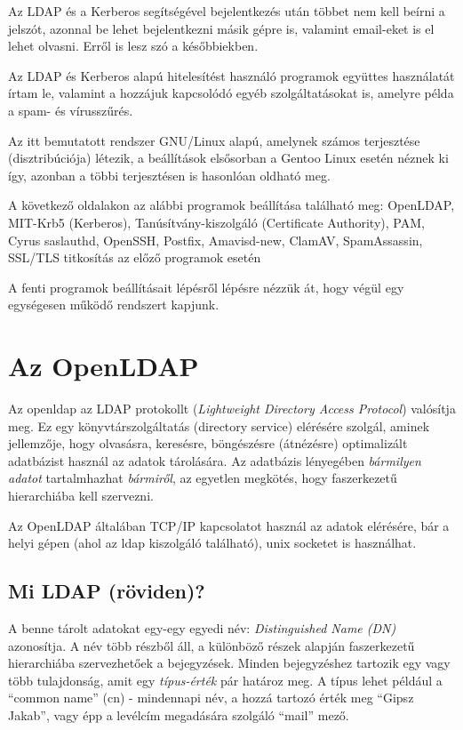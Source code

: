 \documentclass[fleqn,10pt,a4paper,titlepage]{article}
\begin{document}
  Az LDAP és a Kerberos segítségével bejelentkezés után többet nem kell beírni a jelszót, azonnal be lehet bejelentkezni
  másik gépre is, valamint email-eket is el lehet olvasni. Erről is lesz szó a későbbiekben.

  Az LDAP és Kerberos alapú hitelesítést használó programok együttes használatát írtam le, valamint a hozzájuk
  kapcsolódó egyéb szolgáltatásokat is, amelyre példa a spam- és vírusszűrés.

  Az itt bemutatott rendszer GNU/Linux alapú, amelynek számos terjesztése (disztribúciója) létezik, a beállítások
  elsősorban a Gentoo Linux esetén néznek ki így, azonban a többi terjesztésen is hasonlóan oldható meg.

  A következő oldalakon az alábbi programok beállítása található meg:
  OpenLDAP,
  MIT-Krb5 (Kerberos),
  Tanúsítvány-kiszolgáló (Certificate Authority),
  PAM,
  Cyrus saslauthd,
  OpenSSH,
  Postfix,
  Amavisd-new,
  ClamAV,
  SpamAssassin,
  SSL/TLS titkosítás az előző programok esetén
  
  A fenti programok beállításait lépésről lépésre nézzük át, hogy végül egy egységesen működő rendszert kapjunk.
  
  \newpage
  \section{Az OpenLDAP}
  Az openldap az LDAP protokollt ({\em Lightweight Directory Access Protocol}) valósítja meg. Ez egy könyvtárszolgáltatás
  (directory service) elérésére szolgál, aminek jellemzője, hogy olvasásra, keresésre, böngészésre (átnézésre)
  optimalizált adatbázist használ az adatok tárolására. Az adatbázis lényegében \emph{bármilyen adatot} tartalmhazhat
  \emph{bármiről}, az egyetlen megkötés, hogy faszerkezetű hierarchiába kell szervezni.

  Az OpenLDAP általában TCP/IP kapcsolatot használ az adatok elérésére, bár a helyi gépen (ahol az ldap kiszolgáló
  található), unix socketet is használhat.
  
  \subsection{Mi LDAP (röviden)?}
  A benne tárolt adatokat egy-egy egyedi név: {\em Distinguished Name (DN)} azonosítja. A név több részből áll, a
  különböző részek alapján faszerkezetű hierarchiába szervezhetőek a bejegyzések. Minden bejegyzéshez tartozik egy vagy
  több tulajdonság, amit egy {\em típus-érték} pár határoz meg. A típus lehet például a ``common name'' (cn) - mindennapi
  név, a hozzá tartozó érték meg ``Gipsz Jakab'', vagy épp a levélcím megadására szolgáló ``mail'' mező.
\end{document}
